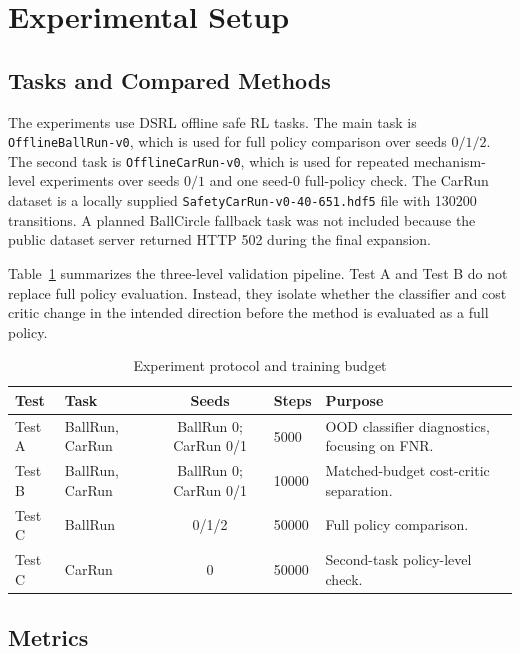 \documentclass[11pt,a4paper]{article}
\begin{document}
\section{Experimental Setup}

\subsection{Tasks and Compared Methods}

The experiments use DSRL offline safe RL tasks. The main task is
\texttt{OfflineBallRun-v0}, which is used for full policy comparison over
seeds \(0/1/2\). The second task is \texttt{OfflineCarRun-v0}, which is used
for repeated mechanism-level experiments over seeds \(0/1\) and one seed-0
full-policy check. The CarRun dataset is a locally supplied
\texttt{SafetyCarRun-v0-40-651.hdf5} file with 130200 transitions. A planned
BallCircle fallback task was not included because the public dataset server
returned HTTP 502 during the final expansion.

Table~\ref{tab:protocol} summarizes the three-level validation pipeline. Test
A and Test B do not replace full policy evaluation. Instead, they isolate
whether the classifier and cost critic change in the intended direction before
the method is evaluated as a full policy.

\begin{table}[H]
  \centering
  \caption{Experiment protocol and training budget}
  \label{tab:protocol}
  \begin{tabularx}{\textwidth}{llclX}
    \toprule
    Test & Task & Seeds & Steps & Purpose \\
    \midrule
    Test A & BallRun, CarRun & BallRun 0; CarRun 0/1 & 5000 &
    OOD classifier diagnostics, focusing on FNR. \\
    Test B & BallRun, CarRun & BallRun 0; CarRun 0/1 & 10000 &
    Matched-budget cost-critic separation. \\
    Test C & BallRun & 0/1/2 & 50000 &
    Full policy comparison. \\
    Test C & CarRun & 0 & 50000 &
    Second-task policy-level check. \\
    \bottomrule
  \end{tabularx}
\end{table}

\subsection{Metrics}
\end{document}
